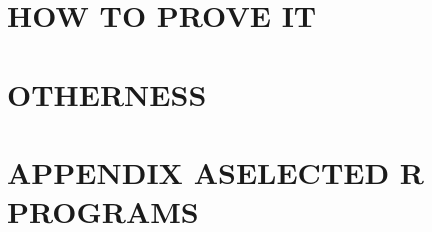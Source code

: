 \documentclass{BGSU}
\numberwithin{equation}{chapter}
\begin{document}
\chapter{\texorpdfstring{HOW TO PROVE IT}{}} %


\chapter{\texorpdfstring{OTHERNESS}{}} %


\backmatter




\mbox{}\newpage
{}
\appendix
\chapter{\texorpdfstring{APPENDIX A\hspace{1em}SELECTED R PROGRAMS}{APPENDIX A}}

\end{document}
